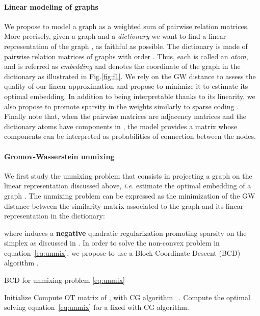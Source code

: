 \documentclass{article}
\def\eqref#1{equation~\ref{#1}}
\begin{document}
	\paragraph{Linear modeling of graphs} We propose to model a graph as a weighted sum of pairwise relation
	matrices. More precisely, given a graph  and a \emph{dictionary}
	 we want to find a linear representation  of the graph , as faithful as
	possible. The dictionary is made of pairwise relation matrices of graphs with
	order . Thus, each   is called an
	\emph{atom}, and  is referred as
	\emph{embedding} and denotes the coordinate of the graph  in the dictionary
	as illustrated in Fig.\ref{fig:f1}. We rely
	on the GW distance to assess the quality of our linear
	approximation and propose to minimize it to estimate its optimal embedding. In
	addition to being interpretable thanks to its linearity, we also propose to promote
	sparsity in the weights  similarly to sparse coding \citep{chen2001atomic}.
	Finally note that, when the pairwise matrices  are adjacency matrices
	and the dictionary atoms have components in , the model
	 provides a matrix whose components
	can be interpreted as probabilities of connection between the nodes.
	
	
	\paragraph{Gromov-Wasserstein unmixing}
	We first study the unmixing problem that consists in projecting a graph on the
	linear representation discussed above, \emph{i.e.} estimate the optimal
	embedding  of a graph .
	The unmixing problem can be expressed as the minimization of the GW
	distance between the similarity matrix associated to the graph and its linear representation in the dictionary:
	
	where  induces a \textbf{negative} quadratic regularization promoting sparsity on the
	simplex as discussed in \citet{li2016methods}. In order to solve the non-convex problem in \eqref{eq:unmix}, we propose to
	use a Block Coordinate Descent (BCD) algorithm \citep{tseng2001convergence}. 
	\begin{algorithm}[t]
		\caption{BCD for unmixing problem \ref{eq:unmix}}
		\label{alg:BCD1}
		\begin{algorithmic}[1]
			\STATE Initialize 
			\REPEAT
			\STATE Compute OT matrix  of , with CG algorithm ~\citep[Alg.1 \& 2]{vayer-fused-2018}.
			\STATE Compute the optimal  solving \eqref{eq:unmix} for a fixed
			 with CG algorithm. 
		\end{algorithmic}
	\end{algorithm}
	
\end{document}
